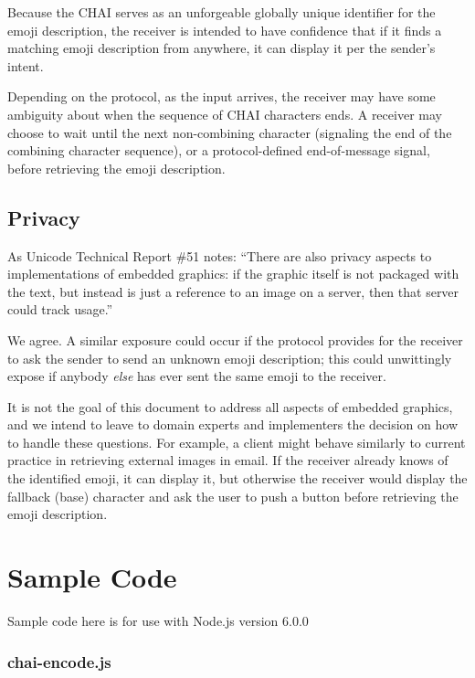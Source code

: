 \documentclass[12pt]{article}
\begin{document}
Because the CHAI serves as an unforgeable globally unique identifier
for the emoji description, the receiver is intended to have confidence
that if it finds a matching emoji description from anywhere, it can
display it per the sender's intent.

Depending on the protocol, as the input arrives, the receiver may have
some ambiguity about when the sequence of CHAI characters ends.  A
receiver may choose to wait until the next non-combining character
(signaling the end of the combining character sequence), or a
protocol-defined end-of-message signal, before retrieving the emoji
description.

\subsection{Privacy}

As Unicode Technical Report \#51 notes: ``There are also privacy
aspects to implementations of embedded graphics: if the graphic itself
is not packaged with the text, but instead is just a reference to an
image on a server, then that server could track usage.''

We agree. A similar exposure could occur if the protocol provides
for the receiver to ask the sender to send an unknown emoji description;
this could unwittingly expose if anybody \emph{else} has ever sent the same
emoji to the receiver.

It is not the goal of this document to address all aspects of embedded
graphics, and we intend to leave to domain experts and implementers
the decision on how to handle these questions. For example, a client
might behave similarly to current practice in retrieving external
images in email. If the receiver already knows of the identified
emoji, it can display it, but otherwise the receiver would display the
fallback (base) character and ask the user to push a button before
retrieving the emoji description.

\section{Sample Code}

Sample code here is for use with Node.js version 6.0.0

\subsubsection{chai-encode.js}


\end{document}
